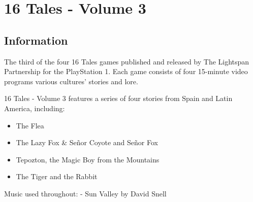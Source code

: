 \chapter{16 Tales - Volume 3}

\section{Information}

The third of the four 16 Tales games published and released by The Lightspan Partnership for the PlayStation 1. Each game consists of four 15-minute video programs various cultures' stories and lore.

16 Tales - Volume 3 features a series of four stories from Spain and Latin America, including:
\begin{itemize}
    \item The Flea
    \item The Lazy Fox \& Señor Coyote and Señor Fox
    \item Tepozton, the Magic Boy from the Mountains
    \item The Tiger and the Rabbit
\end{itemize}

Music used throughout:
- Sun Valley by David Snell

